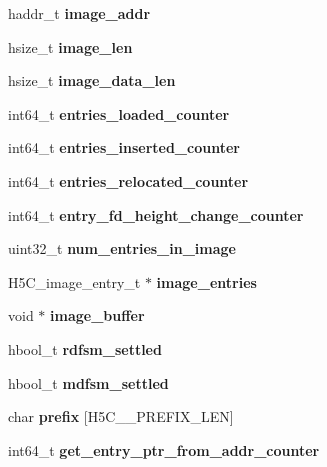 \begin{DoxyCompactItemize}
haddr\+\_\+t {\bfseries image\+\_\+addr}
\item 
\mbox{\label{struct_h5_c__t_afcd4d4fad9ad507ce0b323fc728fec1f}} 
hsize\+\_\+t {\bfseries image\+\_\+len}
\item 
\mbox{\label{struct_h5_c__t_a938462891b28922c59d432eada3131c1}} 
hsize\+\_\+t {\bfseries image\+\_\+data\+\_\+len}
\item 
\mbox{\label{struct_h5_c__t_a9b15d63600ff786c68ea7b0ab2e5632a}} 
int64\+\_\+t {\bfseries entries\+\_\+loaded\+\_\+counter}
\item 
\mbox{\label{struct_h5_c__t_aad3aa007170701f1d462620651339baf}} 
int64\+\_\+t {\bfseries entries\+\_\+inserted\+\_\+counter}
\item 
\mbox{\label{struct_h5_c__t_a1574d380662a637c5ac493c8cc451926}} 
int64\+\_\+t {\bfseries entries\+\_\+relocated\+\_\+counter}
\item 
\mbox{\label{struct_h5_c__t_aa305cecf605eadcd3dc23a934be065ab}} 
int64\+\_\+t {\bfseries entry\+\_\+fd\+\_\+height\+\_\+change\+\_\+counter}
\item 
\mbox{\label{struct_h5_c__t_a090e7b27bb1f5fbca703748981c40a0c}} 
uint32\+\_\+t {\bfseries num\+\_\+entries\+\_\+in\+\_\+image}
\item 
\mbox{\label{struct_h5_c__t_ad1eff364a80f8d0a368e5324e57b3646}} 
H5\+C\+\_\+image\+\_\+entry\+\_\+t $\ast$ {\bfseries image\+\_\+entries}
\item 
\mbox{\label{struct_h5_c__t_a29d572ca2f5348f67328c77ffdd0e779}} 
void $\ast$ {\bfseries image\+\_\+buffer}
\item 
\mbox{\label{struct_h5_c__t_a39fda859d6228ab37d1f0670d9cfe51a}} 
hbool\+\_\+t {\bfseries rdfsm\+\_\+settled}
\item 
\mbox{\label{struct_h5_c__t_a61c706b3774f7ac6c32c6d17e682c51f}} 
hbool\+\_\+t {\bfseries mdfsm\+\_\+settled}
\item 
\mbox{\label{struct_h5_c__t_a98c554048dff2b5c9a005195859f73f4}} 
char {\bfseries prefix} \mbox{[}H5\+C\+\_\+\+\_\+\+P\+R\+E\+F\+I\+X\+\_\+\+L\+EN\mbox{]}
\item 
\mbox{\label{struct_h5_c__t_a83d4d1d6b97ec167b7b868fcf2a887af}} 
int64\+\_\+t {\bfseries get\+\_\+entry\+\_\+ptr\+\_\+from\+\_\+addr\+\_\+counter}
\end{DoxyCompactItemize}


